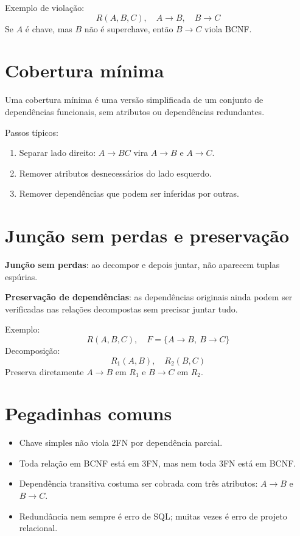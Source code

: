 \documentclass[12pt,a4paper]{article}
\begin{document}
Exemplo de violação:
\[
R(A,B,C),\quad A\rightarrow B,\quad B\rightarrow C
\]
Se $A$ é chave, mas $B$ não é superchave, então $B\rightarrow C$ viola BCNF.

\section{Cobertura mínima}
Uma cobertura mínima é uma versão simplificada de um conjunto de dependências funcionais, sem atributos ou dependências redundantes.

Passos típicos:
\begin{enumerate}
    \item Separar lado direito: $A\rightarrow BC$ vira $A\rightarrow B$ e $A\rightarrow C$.
    \item Remover atributos desnecessários do lado esquerdo.
    \item Remover dependências que podem ser inferidas por outras.
\end{enumerate}

\section{Junção sem perdas e preservação}
\textbf{Junção sem perdas}: ao decompor e depois juntar, não aparecem tuplas espúrias.

\textbf{Preservação de dependências}: as dependências originais ainda podem ser verificadas nas relações decompostas sem precisar juntar tudo.

Exemplo:
\[
R(A,B,C),\quad F=\{A\rightarrow B,\ B\rightarrow C\}
\]
Decomposição:
\[
R_1(A,B),\quad R_2(B,C)
\]
Preserva diretamente $A\rightarrow B$ em $R_1$ e $B\rightarrow C$ em $R_2$.

\section{Pegadinhas comuns}
\begin{itemize}
    \item Chave simples não viola 2FN por dependência parcial.
    \item Toda relação em BCNF está em 3FN, mas nem toda 3FN está em BCNF.
    \item Dependência transitiva costuma ser cobrada com três atributos: $A\rightarrow B$ e $B\rightarrow C$.
    \item Redundância nem sempre é erro de SQL; muitas vezes é erro de projeto relacional.
\end{itemize}
\end{document}
